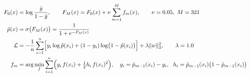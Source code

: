 \begin{align}
F_0(x) &= \log\frac{\bar{y}}{1-\bar{y}}, \qquad
F_M(x) = F_0(x) + \nu \sum_{m=1}^{M} f_m(x), \qquad \nu = 0.05,\ M = 321 \\
\hat{p}(x) &= \sigma\bigl(F_M(x)\bigr) = \frac{1}{1 + e^{-F_M(x)}} \\
\mathcal{L} &= -\frac{1}{n}\sum_{i=1}^{n}\Bigl[y_i \log \hat{p}(x_i) + (1-y_i)\log\bigl(1-\hat{p}(x_i)\bigr)\Bigr] + \lambda \lVert w \rVert_2^2,
\qquad \lambda = 1.0 \\
f_m &= \arg\min_{f} \sum_{i=1}^{n} \Bigl(g_i\, f(x_i) + \tfrac{1}{2} h_i\, f(x_i)^2\Bigr), \quad
g_i = \hat{p}_{m-1}(x_i) - y_i,\ \ h_i = \hat{p}_{m-1}(x_i)\bigl(1-\hat{p}_{m-1}(x_i)\bigr)
\end{align}
